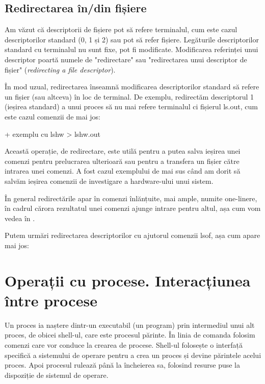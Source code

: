 \subsection{Redirectarea în/din fișiere}
\label{sec:procese-fisiere-redirectare}

Am văzut că descriptorii de fișiere pot să refere terminalul, cum este cazul
descriptorilor standard (0, 1 și 2) sau pot să refer fișiere. Legăturile
descriptorilor standard cu terminalul nu sunt fixe, pot fi modificate.
Modificarea referinței unui descriptor poartă numele de "redirectare" sau
"redirectarea unui descriptor de fișier" (\textit{redirecting a file
descriptor}).

În mod uzual, redirectarea înseamnă modificarea descriptorilor standard să
refere un fișier (sau altceva) în loc de terminal. De exemplu, redirectăm
descriptorul 1 (ieșirea standard) a unui proces să nu mai refere terminalul ci
fișierul ls.out, cum este cazul comenzii de mai jos:

+ exemplu cu lshw > lshw.out

Această operație, de redirectare, este utilă pentru a putea salva ieșirea unei
comenzi pentru prelucrarea ulterioară sau pentru a transfera un fișier către
intrarea unei comenzi. A fost cazul exemplului de mai sus când am dorit să
salvăm ieșirea comenzii de investigare a hardware-ului unui sistem.

În general redirectările apar în comenzi înlănțuite, mai ample, numite
one-linere, în cadrul cărora rezultatul unei comenzi ajunge intrare pentru
altul, așa cum vom vedea în
.

Putem urmări redirectarea descriptorilor cu ajutorul comenzii lsof, așa cum
apare mai jos:

\section{Operații cu procese. Interacțiunea între procese}
\label{sec:procese-operatii}

Un proces ia naștere dintr-un executabil (un program) prin intermediul unui alt
proces, de obicei shell-ul, care este procesul părinte. În linia de comanda
folosim comenzi care vor conduce la crearea de procese. Shell-ul folosește o
interfață specifică a sistemului de operare pentru a crea un proces și devine
părintele acelui proces. Apoi procesul rulează până la încheierea sa, folosind
resurse puse la dispoziție de sistemul de operare.


